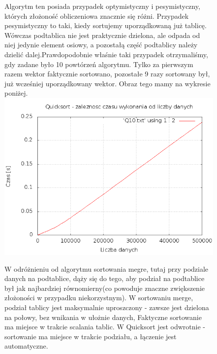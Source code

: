 \documentclass[a4paper,11pt]{report}
\begin{document}
\begin{figure}
  \begin{center}

Algorytm ten posiada przypadek optymistyczny i pesymistyczny, których złożoność obliczeniowa znacznie się różni. Przypadek pesymistyczny to taki, kiedy sortujemy uporządkowaną już tablicę. Wówczas podtablica nie jest praktycznie dzielona, ale odpada od niej jedynie element osiowy, a pozostałą część podtablicy należy dzielić dalej.Prawdopodobnie właśnie taki przypadek otrzymaliśmy, gdy zadane było 10 powtórzeń algorytmu. Tylko za pierwszym razem wektor faktycznie sortowano, pozostałe 9 razy sortowany był, już wcześniej uporządkowany wektor. Obraz tego mamy na wykresie poniżej.
\\
    \includegraphics[scale=0.5]{./quick10.png}
    \label{fig:}
  \end{center}
\end{figure}

\begin{figure}
  \begin{center}
W odróżnieniu od algorytmu sortowania megre, tutaj przy podziale danych na podtablice, dąży się do tego, aby podział na podtablice był jak najbardziej równomierny(co powoduje znaczne zwiększenie złożoności w przypadku niekorzystnym). W sortowaniu merge, podział tablicy jest maksymalnie uproszczony - zawsze jest dzielona na połowy, bez wnikania w ułożnie danych, Faktyczne sortowanie ma miejsce w trakcie scalania tablic. W Quicksort jest odwrotnie - sortowanie ma miejsce w trakcie podziału, a łączenie jest automatyczne.
    \label{fig:}
  \end{center}
\end{figure}
\end{document}

